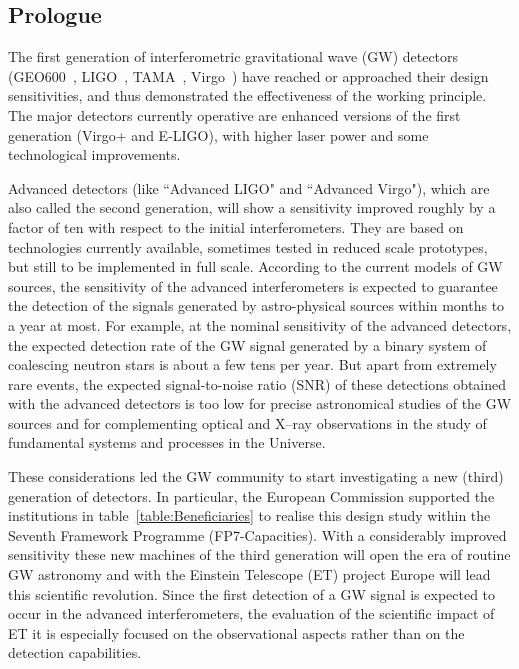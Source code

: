 %
%
%
\subsection[Prologue]{Prologue}
\label{Prologue}
The first generation of interferometric gravitational wave (GW) detectors (GEO600~\cite{GEO600Grote2008}, LIGO~\cite{Abbott2009}, TAMA~\cite{Arai2008}, Virgo~\cite{VirgoStatus2008}) have reached or approached their design sensitivities, and thus demonstrated the effectiveness of the working principle. The major detectors currently operative are enhanced versions of the first generation (Virgo+ and E-LIGO), with higher laser power and some technological improvements. \par
Advanced detectors (like ``Advanced LIGO" and ``Advanced Virgo"), which are also called the second generation, will show a sensitivity improved roughly by a factor of ten with respect to the initial interferometers. They are based on technologies currently available, sometimes tested in reduced scale prototypes, but still to be implemented in full scale. According to the current models of GW sources, the sensitivity of the advanced interferometers is expected to guarantee the detection of the signals generated by astro-physical sources within months to a year at most. For example, at the nominal sensitivity of the advanced detectors, the expected detection rate of the GW signal generated by a binary system of coalescing neutron stars is about a few tens per year. But apart from extremely rare events, the expected signal-to-noise ratio (SNR) of these detections obtained with the advanced detectors is too low for precise astronomical studies of the GW sources and for complementing optical and X--ray observations in the study of fundamental systems and processes in the Universe. \par
These considerations led the GW community to start investigating a new (third) generation of detectors. In particular, the European Commission supported the institutions in table~\ref{table:Beneficiaries} to realise this design study within the Seventh Framework Programme (FP7-Capacities). With a considerably improved sensitivity these new machines of the third generation will open the era of routine GW astronomy and with the Einstein Telescope (ET) project Europe will lead this scientific revolution. Since the first detection of a GW signal is expected to occur in the advanced interferometers, the evaluation of the scientific impact of ET it is especially focused on the observational aspects rather than on the detection capabilities. \par
